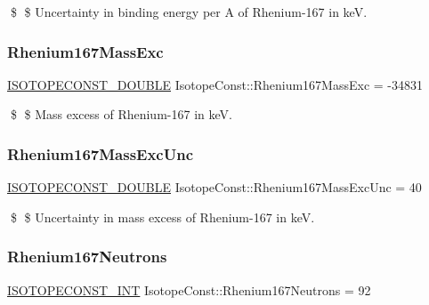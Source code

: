 \$ \$ Uncertainty in binding energy per A of Rhenium-\/167 in keV. \mbox{\label{group___isotope_const-_rhenium-_re167_ga856463ac96d45707603fbd842e09226d}} 
\subsubsection{\texorpdfstring{Rhenium167\+Mass\+Exc}{Rhenium167MassExc}}
{\footnotesize\ttfamily \mbox{\hyperlink{group___isotope_const-_macros_ga8f45a7272ce02c0b4c65c44636ed719a}{I\+S\+O\+T\+O\+P\+E\+C\+O\+N\+S\+T\+\_\+\+D\+O\+U\+B\+LE}} Isotope\+Const\+::\+Rhenium167\+Mass\+Exc = -\/34831}

\$ \$ Mass excess of Rhenium-\/167 in keV. \mbox{\label{group___isotope_const-_rhenium-_re167_ga0052c83c552948ae63150b591f008f24}} 
\subsubsection{\texorpdfstring{Rhenium167\+Mass\+Exc\+Unc}{Rhenium167MassExcUnc}}
{\footnotesize\ttfamily \mbox{\hyperlink{group___isotope_const-_macros_ga8f45a7272ce02c0b4c65c44636ed719a}{I\+S\+O\+T\+O\+P\+E\+C\+O\+N\+S\+T\+\_\+\+D\+O\+U\+B\+LE}} Isotope\+Const\+::\+Rhenium167\+Mass\+Exc\+Unc = 40}

\$ \$ Uncertainty in mass excess of Rhenium-\/167 in keV. \mbox{\label{group___isotope_const-_rhenium-_re167_gab188e997827527dcb17db80db2d5c189}} 
\subsubsection{\texorpdfstring{Rhenium167\+Neutrons}{Rhenium167Neutrons}}
{\footnotesize\ttfamily \mbox{\hyperlink{group___isotope_const-_macros_ga5f18360b3e99483a35c32d789e62621c}{I\+S\+O\+T\+O\+P\+E\+C\+O\+N\+S\+T\+\_\+\+I\+NT}} Isotope\+Const\+::\+Rhenium167\+Neutrons = 92}

